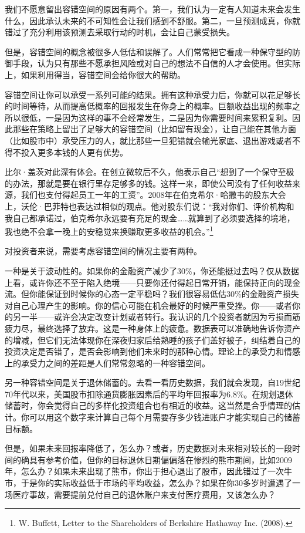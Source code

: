 我们不愿意留出容错空间的原因有两个。第一，我们认为一定有人知道未来会发生什么，因此承认未来的不可知性会让我们感到不舒服。第二，一旦预测成真，你就错过了充分利用该预测去采取行动的时机，会让自己蒙受损失。

但是，容错空间的概念被很多人低估和误解了。人们常常把它看成一种保守型的防御手段，认为只有那些不愿承担风险或对自己的想法不自信的人才会使用。但实际上，如果利用得当，容错空间会给你很大的帮助。

容错空间让你可以承受一系列可能的结果。拥有这种承受力后，你就可以花足够长的时间等待，从而提高低概率的回报发生在你身上的概率。巨额收益出现的频率之所以很低，一是因为这样的事不会经常发生，二是因为你需要时间来累积复利。因此那些在策略上留出了足够大的容错空间（比如留有现金），让自己能在其他方面（比如股市中）承受压力的人，就比那些一旦犯错就会输光家底、退出游戏或者不得不投入更多本钱的人更有优势。

比尔·盖茨对此深有体会。在创立微软后不久，他表示自己“想到了一个保守至极的办法，那就是要在银行里存足够多的钱。这样一来，即使公司没有了任何收益来源，我们也支付得起员工一年的工资”。2008年在伯克希尔·哈撒韦的股东大会上，沃伦·巴菲特也表达过相似的观点。他对股东们说：“我对你们、评价机构和我自己都承诺过，伯克希尔永远要有充足的现金……就算到了必须要选择的境地，我也绝不会拿一晚上的安稳觉来换赚取更多收益的机会。”\footnote{W. Buffett, Letter to the Shareholders of Berkshire Hathaway Inc. (2008).}

对投资者来说，需要考虑容错空间的情况主要有两种。

一种是关于波动性的。如果你的金融资产减少了30\%，你还能挺过去吗？仅从数据上看，或许你还不至于陷入绝境——只要你还付得起日常开销，能保持正向的现金流。但你能保证到时候你的心态一定平稳吗？我们很容易低估30\%的金融资产损失对自己心理产生的影响。你的信心可能在机会最好的时候严重受挫。你——或者你的另一半——或许会决定改变计划或者转行。我认识的几个投资者就因为亏损而筋疲力尽，最终选择了放弃。这是一种身体上的疲惫。数据表可以准确地告诉你资产的增减，但它们无法体现你在深夜归家后给熟睡的孩子们盖好被子，纠结着自己的投资决定是否错了，是否会影响到他们未来时的那种心情。理论上的承受力和情感上的承受力之间的差距是人们常常忽略的一种容错空间。

另一种容错空间是关于退休储蓄的。去看一看历史数据，我们就会发现，自19世纪70年代以来，美国股市扣除通货膨胀因素后的平均年回报率为6.8\%。在规划退休储蓄时，你会觉得自己的多样化投资组合也有相近的收益。这当然是合乎情理的估计。你可以用这个数字来计算自己每个月需要存多少钱进账户才能实现自己的储蓄目标额。

但是，如果未来回报率降低了，怎么办？或者，历史数据对未来相对较长的一段时间的确具有参考价值，但你的目标退休日期偏偏落在惨烈的熊市期间，比如2009年，怎么办？如果未来出现了熊市，你出于担心退出了股市，因此错过了一次牛市，于是你的实际收益低于市场的平均收益，怎么办？如果在你30多岁时遭遇了一场医疗事故，需要提前兑付自己的退休账户来支付医疗费用，又该怎么办？

